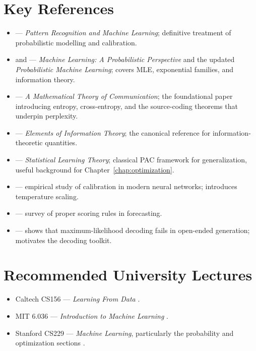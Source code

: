 \section{Key References}

\begin{itemize}
  \item \citet{bishop2006prml} --- \emph{Pattern Recognition and Machine Learning}; definitive treatment of probabilistic modelling and calibration.
  \item \citet{murphy2012mlpp} and \citet{murphy2022pml} --- \emph{Machine Learning: A Probabilistic Perspective} and the updated \emph{Probabilistic Machine Learning}; covers MLE, exponential families, and information theory.
  \item \citet{shannon1948} --- \emph{A Mathematical Theory of Communication}; the foundational paper introducing entropy, cross-entropy, and the source-coding theorems that underpin perplexity.
  \item \citet{cover2006elements} --- \emph{Elements of Information Theory}; the canonical reference for information-theoretic quantities.
  \item \citet{vapnik1998statistical} --- \emph{Statistical Learning Theory}; classical PAC framework for generalization, useful background for Chapter~\ref{chap:optimization}.
  \item \citet{guo2017calibration} --- empirical study of calibration in modern neural networks; introduces temperature scaling.
  \item \citet{gneiting2007strictly} --- survey of proper scoring rules in forecasting.
  \item \citet{holtzman2020curious} --- shows that maximum-likelihood decoding fails in open-ended generation; motivates the decoding toolkit.
\end{itemize}

\section{Recommended University Lectures}

\begin{itemize}
  \item Caltech CS156 --- \emph{Learning From Data} \citep{caltech_cs156}.
  \item MIT 6.036 --- \emph{Introduction to Machine Learning} \citep{mit_6036}.
  \item Stanford CS229 --- \emph{Machine Learning}, particularly the probability and optimization sections \citep{stanford_cs229}.
\end{itemize}


